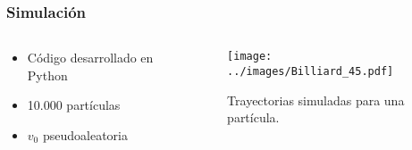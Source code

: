\documentclass{beamer}
\begin{document}

\begin{frame}
    \frametitle[prueb1]{Simulación}
    \begin{columns}
        \begin{column}{0.5\textwidth}
            \begin{itemize}
                \item Código desarrollado en Python
                \item 10.000 partículas
                \item \( v_0 \) pseudoaleatoria
            \end{itemize}
        \end{column}
        \hspace{-1.3cm}
        \begin{column}{0.5\textwidth}
            \begin{figure}
                \centering
                \texttt{[image: ../images/Billiard\_45.pdf]}
                \caption{Trayectorias simuladas para una partícula.}
            \end{figure}  
        \end{column}
    \end{columns}
\end{frame}
\end{document}
